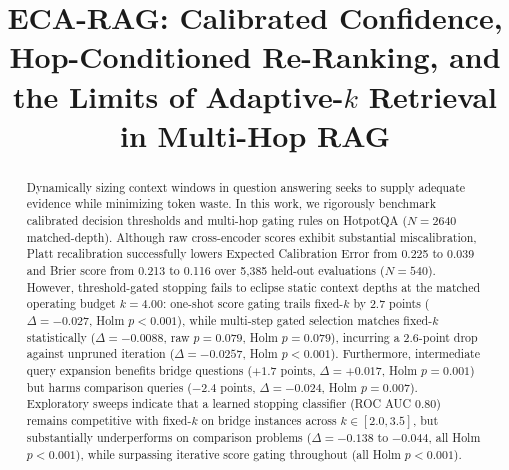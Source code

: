 \documentclass[conference]{IEEEtran}
\begin{document}

\title{ECA-RAG: Calibrated Confidence, Hop-Conditioned Re-Ranking, and the Limits of Adaptive-$k$ Retrieval in Multi-Hop RAG}

\author{
}

\maketitle

\begin{abstract}
Dynamically sizing context windows in question answering seeks to supply adequate evidence while minimizing token waste. In this work, we rigorously benchmark calibrated decision thresholds and multi-hop gating rules on HotpotQA ($N=2640$ matched-depth). Although raw cross-encoder scores exhibit substantial miscalibration, Platt recalibration successfully lowers Expected Calibration Error from 0.225 to 0.039 and Brier score from 0.213 to 0.116 over 5,385 held-out evaluations ($N=540$). However, threshold-gated stopping fails to eclipse static context depths at the matched operating budget $k=4.00$: one-shot score gating trails fixed-$k$ by 2.7 points ($\Delta = -0.027$, Holm $p < 0.001$), while multi-step gated selection matches fixed-$k$ statistically ($\Delta = -0.0088$, raw $p=0.079$, Holm $p=0.079$), incurring a 2.6-point drop against unpruned iteration ($\Delta = -0.0257$, Holm $p < 0.001$). Furthermore, intermediate query expansion benefits bridge questions ($+1.7$ points, $\Delta = +0.017$, Holm $p=0.001$) but harms comparison queries ($-2.4$ points, $\Delta = -0.024$, Holm $p=0.007$). Exploratory sweeps indicate that a learned stopping classifier (ROC AUC 0.80) remains competitive with fixed-$k$ on bridge instances across $k \in [2.0, 3.5]$, but substantially underperforms on comparison problems ($\Delta = -0.138$ to $-0.044$, all Holm $p < 0.001$), while surpassing iterative score gating throughout (all Holm $p < 0.001$).
\end{abstract}
\end{document}
